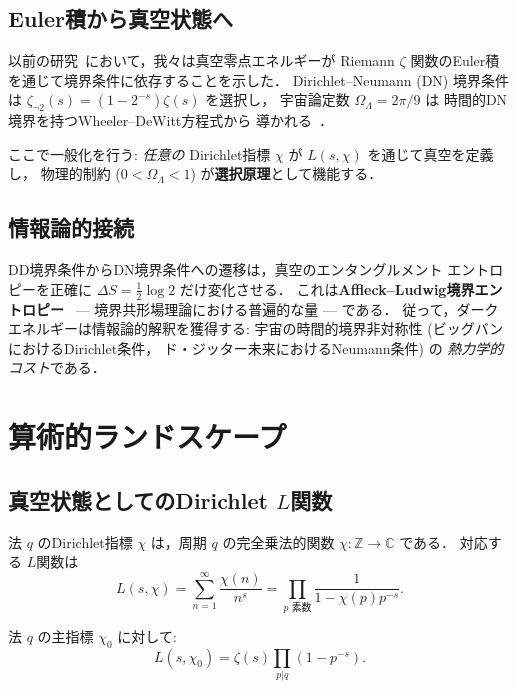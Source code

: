 \documentclass[11pt,a4paper]{article}
\begin{document}
\subsection{Euler積から真空状態へ}

以前の研究~\cite{wb-functional}において，我々は真空零点エネルギーが
Riemann $\zeta$ 関数のEuler積を通じて境界条件に依存することを示した．
Dirichlet--Neumann (DN) 境界条件は
$\zeta_{\neg 2}(s) = (1 - 2^{-s})\zeta(s)$ を選択し，
宇宙論定数 $\Omega_\Lambda = 2\pi/9$ は
時間的DN境界を持つWheeler--DeWitt方程式から
導かれる~\cite{wb-wdw}．

ここで一般化を行う: \emph{任意の} Dirichlet指標 $\chi$ が
$L(s, \chi)$ を通じて真空を定義し，
物理的制約 ($0 < \Omega_\Lambda < 1$) が\textbf{選択原理}として機能する．

\subsection{情報論的接続}

DD境界条件からDN境界条件への遷移は，真空のエンタングルメント
エントロピーを正確に $\Delta S = \frac{1}{2}\log 2$ だけ変化させる．
これは\textbf{Affleck--Ludwig境界エントロピー}~\cite{AffleckLudwig1991}
--- 境界共形場理論における普遍的な量 --- である．
従って，ダークエネルギーは情報論的解釈を獲得する:
宇宙の時間的境界非対称性 (ビッグバンにおけるDirichlet条件，
ド・ジッター未来におけるNeumann条件) の
\emph{熱力学的コスト}である．

\section{算術的ランドスケープ}

\subsection{真空状態としてのDirichlet $L$関数}

法 $q$ のDirichlet指標 $\chi$ は，周期 $q$ の完全乗法的関数
$\chi: \mathbb{Z} \to \mathbb{C}$ である．
対応する $L$関数は
\begin{equation}
L(s, \chi) = \sum_{n=1}^\infty \frac{\chi(n)}{n^s}
= \prod_{p\text{ 素数}} \frac{1}{1 - \chi(p)p^{-s}}.
\end{equation}

法 $q$ の主指標 $\chi_0$ に対して:
\begin{equation}
L(s, \chi_0) = \zeta(s)\prod_{p | q}(1 - p^{-s}).
\end{equation}
\end{document}
